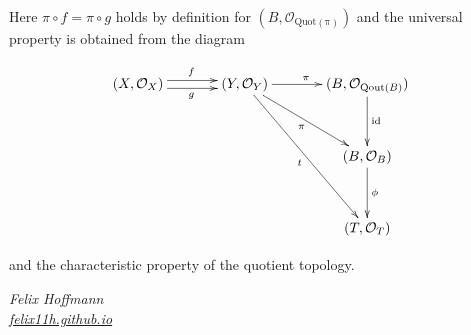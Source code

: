 \documentclass[a4paper]{amsart}            %
\renewcommand{\O}{\mathcal{O}}
\newcommand{\id}{\operatorname{id}}
\theoremstyle{plain}                                               %
\begin{document}
Here $\pi \circ f = \pi \circ g$ holds by definition for $(B,\O_{\operatorname{Quot(\pi)}})$ and the universal property is obtained from the diagram

\begin{align*} \xymatrix@+=1.25cm{(X,\O_X) \ar@<0.66ex>[r]^f \ar@<-0.66ex>[r]_g & (Y,\O_Y) \ar[ddr]_t \ar[dr]_{\pi} \ar[r]^{\pi} & (B,\O_{\operatorname{Qout}(B)}) \ar[d]^{\id}\\
																								&	&	 (B,\O_B) \ar[d]^{\phi} \\ & & (T,\O_T) } \end{align*}

and the characteristic property of the quotient topology.

\vspace{6.4cm}
\begin{flushright}
\textsl{\small    Felix Hoffmann\\ \href{http://felix11h.github.io}{felix11h.github.io}}
\end{flushright}

																									 
\end{document}
